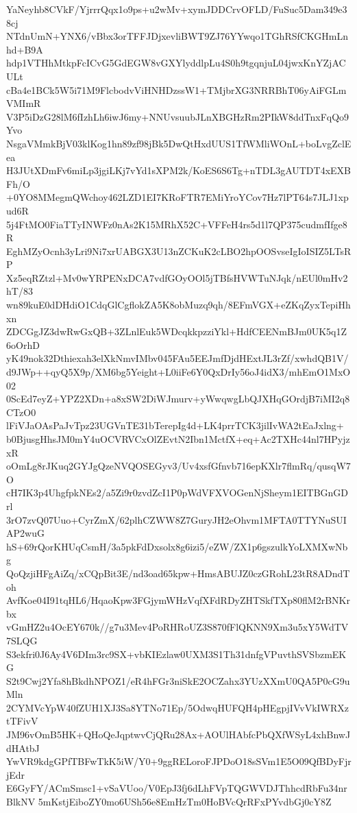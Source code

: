 YaNeyhb8CVkF/YjrrrQqx1o9ps+u2wMv+xymJDDCrvOFLD/FuSuc5Dam349e38cj
NTdnUmN+YNX6/vBbx3orTFFJDjxevliBWT9ZJ76YYwqo1TGhRSfCKGHmLnhd+B9A
hdp1VTHhMtkpFcICvG5GdEGW8vGXYlyddlpLu4S0h9tgqnjuL04jwxKnYZjACULt
cBa4e1BCk5W5i71M9FlcbodvViHNHDzssW1+TMjbrXG3NRRBhT06yAiFGLmVMImR
V3P5iDzG28lM6fIzhLh6iwJ6my+NNUvsuubJLnXBGHzRm2PIkW8ddTnxFqQo9Yvo
NsgaVMmkBjV03klKog1hn89zf98jBk5DwQtHxdUUS1TfWMliWOnL+boLvgZclEea
H3JUtXDmFv6miLp3jgiLKj7vYd1sXPM2k/KoES6S6Tg+nTDL3gAUTDT4xEXBFh/O
+0YO8MMegmQWchoy462LZD1EI7KRoFTR7EMiYroYCov7Hz7lPT64s7JLJ1xpud6R
5j4FtMO0FiaTTyINWFz0nAs2K15MRhX52C+VFFeH4rs5d1l7QP375cudmfIfge8R
EghMZyOcnh3yLri9Ni7xrUABGX3U13nZCKuK2cLBO2hpOOSvseIgIoISIZ5LTsRP
Xz5eqRZtzl+Mv0wYRPENxDCA7vdfGOyOOl5jTBfsHVWTuNJqk/nEUl0mHv2hT/83
wn89kuE0dDHdiO1CdqGlCgflokZA5K8obMuzq9qh/8EFmVGX+eZKqZyxTepiHhxn
ZDCGgJZ3dwRwGxQB+3ZLnlEuk5WDcqkkpzziYkl+HdfCEENmBJm0UK5q1Z6oOrhD
yK49nok32Dthiexah3elXkNmvIMbv045FAu5EEJmfDjdHExtJL3rZf/xwhdQB1V/
d9JWp++qyQ5X9p/XM6bg5Yeight+L0iiFe6Y0QxDrIy56oJ4idX3/mhEmO1MxO02
0ScEd7eyZ+YPZ2XDn+a8xSW2DiWJmurv+yWwqwgLbQJXHqGOrdjB7iMI2q8CTzO0
lFiVJaOAsPaJvTpz23UGVnTE31bTerepIg4d+LK4prrTCK3jilIvWA2tEaJxlng+
b0BjusgHhsJM0mY4uOCVRVCxOlZEvtN2Ibn1MctfX+eq+Ac2TXHc44nl7HPyjzxR
oOmLg8rJKuq2GYJgQzeNVQOSEGyv3/Uv4xsfGfnvb716epKXlr7flmRq/qusqW7O
cH7IK3p4UhgfpkNEs2/a5Zi9r0zvdZcI1P0pWdVFXVOGenNjSheym1EITBGnGDrl
3rO7zvQ07Uuo+CyrZmX/62plhCZWW8Z7GuryJH2eOhvm1MFTA0TTYNuSUIAP2wuG
hS+69rQorKHUqCsmH/3a5pkFdDxsolx8g6izi5/eZW/ZX1p6gszulkYoLXMXwNbg
QoQzjiHFgAiZq/xCQpBit3E/nd3oad65kpw+HmsABUJZ0czGRohL23tR8ADndToh
AvfKoe04I91tqHL6/HqaoKpw3FGjymWHzVqfXFdRDyZHTSkfTXp80flM2rBNKrbx
vGmHZ2u4OcEY670k//g7u3Mev4PoRHRoUZ3S870fFlQKNN9Xm3u5xY5WdTV7SLQG
S3ekfri0J6Ay4V6DIm3rc9SX+vbKIEzlaw0UXM3S1Th31dnfgVPuvthSVSbzmEKG
S2t9Cwj2Yfa8hBkdhNPOZ1/eR4hFGr3niSkE2OCZahx3YUzXXmU0QA5P0cG9uMln
2CYMVcYpW40fZUH1XJ3Sa8YTNo71Ep/5OdwqHUFQH4pHEgpjIVvVkIWRXztTFivV
JM96vOmB5HK+QHoQeJqptwvCjQRu28Ax+AOUlHAbfcPbQXfWSyL4xhBnwJdHAtbJ
YwVR9kdgGPfTBFwTkK5iW/Y0+9ggRELoroFJPDoO18sSVm1E5O09QfBDyFjrjEdr
E6GyFY/ACmSmsc1+vSaVUoo/V0EpJ3fj6dLhFVpTQGWVDJThhcdRbFu34nrBlkNV
5mKstjEiboZY0mo6USh56e8EmHzTm0HoBVcQrRFxPYvdbGj0cY8Z
